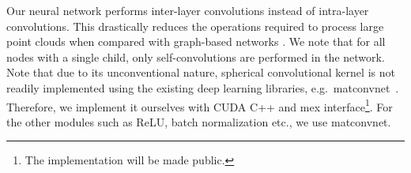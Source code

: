 \documentclass[10pt,twocolumn,letterpaper]{article}
\begin{document}
Our neural network performs inter-layer convolutions instead of intra-layer convolutions. This drastically reduces the operations required to process large point clouds when compared with graph-based networks  \cite{bruna2013spectral,defferrard2016convolutional,kipf2017semi,simonovsky2017dynamic,yi2017syncspeccnn}. We note that for all nodes with a single child, only self-convolutions are performed in the network. Note that due to its unconventional nature, spherical convolutional kernel  is not readily implemented using the existing deep learning libraries, e.g.~matconvnet~\cite{vedaldi2015matconvnet}. Therefore, we implement it ourselves with CUDA C++ and mex interface\footnote{The implementation will be made public.}. For the other modules such as ReLU, batch normalization etc., we use matconvnet.

\vspace{-5mm}
\end{document}
